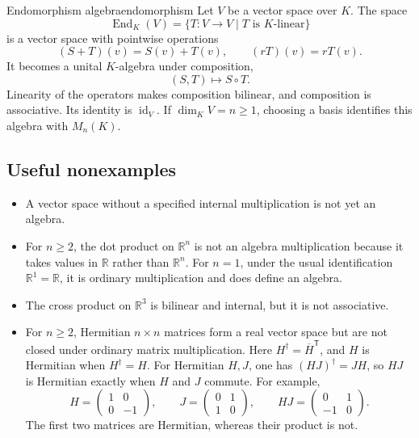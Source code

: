 \documentclass[10pt,a4paper]{article}
\newcommand{\R}{\mathbb{R}}
\newcommand{\End}{\operatorname{End}}
\begin{document}
\begin{examplebox}{Endomorphism algebra}{endomorphism}
Let $V$ be a vector space over $K$. The space
\[
  \End_K(V)=\{T:V\to V\mid T\text{ is $K$-linear}\}
\]
is a vector space with pointwise operations
\[
  (S+T)(v)=S(v)+T(v),\qquad (rT)(v)=rT(v).
\]
It becomes a unital $K$-algebra under composition,
\[
  (S,T)\longmapsto S\circ T.
\]
Linearity of the operators makes composition bilinear, and composition is
associative. Its identity is $\operatorname{id}_V$.
If $\dim_K V=n\geq1$, choosing a basis identifies this algebra with $M_n(K)$.
\end{examplebox}

\subsection{Useful nonexamples}

\begin{itemize}
  \item A vector space without a specified internal multiplication is not yet
  an algebra.

  \item For $n\geq2$, the dot product on $\R^n$ is not an algebra multiplication because it
  takes values in $\R$ rather than $\R^n$.
  For $n=1$, under the usual identification $\R^1=\R$, it is ordinary
  multiplication and does define an algebra.

  \item The cross product on $\R^3$ is bilinear and internal, but it is not
  associative.

  \item For $n\geq2$, Hermitian $n\times n$ matrices form a real vector space
  but are not closed under ordinary matrix multiplication. Here
  $H^\dagger=\overline H^{\mathsf T}$, and $H$ is Hermitian when $H^\dagger=H$.
  For Hermitian $H,J$, one has $(HJ)^\dagger=JH$, so $HJ$ is Hermitian exactly
  when $H$ and $J$ commute. For example,
  \[
    H=\begin{pmatrix}1&0\\0&-1\end{pmatrix},\qquad
    J=\begin{pmatrix}0&1\\1&0\end{pmatrix},\qquad
    HJ=\begin{pmatrix}0&1\\-1&0\end{pmatrix}.
  \]
  The first two matrices are Hermitian, whereas their product is not.
\end{itemize}
\end{document}
